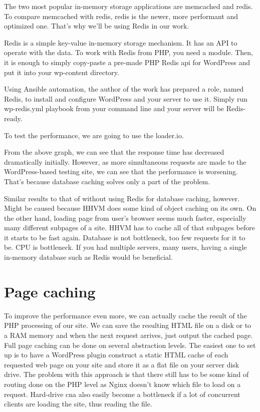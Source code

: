 The two most popular in-memory storage applications are memcached and redis. To compare memcached with redis, redis is the newer, more performant and optimized one. That's why we'll be using Redis in our work.

Redis is a simple key-value in-memory storage mechanism. It has an API to operate with the data. To work with Redis from PHP, you need a module. Then, it is enough to simply copy-paste a pre-made PHP Redis api for WordPress and put it into your wp-content directory.

Using Ansible automation, the author of the work has prepared a role, named Redis, to install and configure WordPress and your server to use it. Simply run wp-redis.yml playbook from your command line and your server will be Redis-ready.

To test the performance, we are going to use the loader.io.

From the above graph, we can see that the response time has decreased dramatically initially. However, as more simultaneous requests are made to the WordPress-based testing site, we can see that the performance is worsening. That's because database caching solves only a part of the problem.

Similar results to that of without using Redis for database caching, however. Might be caused because HHVM does some kind of object caching on its own. On the other hand, loading page from user's browser seems much faster, especially many different subpages of a site. HHVM has to cache all of that subpages before it starts to be fast again. Database is not bottleneck, too few requests for it to be. CPU is bottleneck. If you had multiple servers, many users, having a single in-memory database such as Redis would be beneficial.

\section{Page caching} \label{page-caching}

To improve the performance even more, we can actually cache the result of the PHP processing of our site. We can save the resulting HTML file on a disk or to a RAM memory and when the next request arrives, just output the cached page. Full page caching can be done on several abstraction levels. The easiest one to set up is to have a WordPress plugin construct a static HTML cache of each requested web page on your site and store it as a flat file on your server disk drive. The problem with this approach is that there still has to be some kind of routing done on the PHP level as Nginx doesn't know which file to load on a request. Hard-drive cna also easily become a bottleneck if a lot of concurrent clients are loading the site, thus reading the file.

